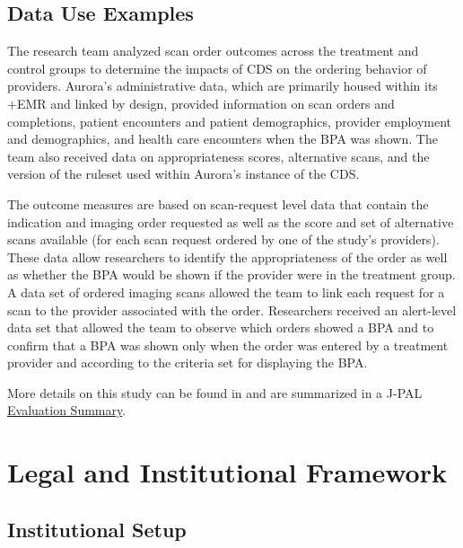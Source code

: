\documentclass[
]{book}
\begin{document}
\hypertarget{data-use-examples-4}{%
\subsection{Data Use Examples}\label{data-use-examples-4}}

The research team analyzed scan order outcomes across the treatment and control groups to determine the impacts of CDS on the ordering behavior of providers. Aurora's administrative data, which are primarily housed within its +EMR\textbar{} and linked by design, provided information on scan orders and completions, patient encounters and patient demographics, provider employment and demographics, and health care encounters when the BPA was shown. The team also received data on appropriateness scores, alternative scans, and the version of the ruleset used within Aurora's instance of the CDS.

The outcome measures are based on scan-request level data that contain the indication and imaging order requested as well as the score and set of alternative scans available (for each scan request ordered by one of the study's providers). These data allow researchers to identify the appropriateness of the order as well as whether the BPA would be shown if the provider were in the treatment group. A data set of ordered imaging scans allowed the team to link each request for a scan to the provider associated with the order. Researchers received an alert-level data set that allowed the team to observe which orders showed a BPA and to confirm that a BPA was shown only when the order was entered by a treatment provider and according to the criteria set for displaying the BPA.

More details on this study can be found in \citep{doyle2019} and are summarized in a J-PAL \href{https://www.povertyactionlab.org/evaluation/clinical-decision-support-radiology-imaging-united-states}{Evaluation Summary}.

\hypertarget{legal-and-institutional-framework-4}{%
\section{Legal and Institutional Framework}\label{legal-and-institutional-framework-4}}

\hypertarget{institutional-setup-4}{%
\subsection{Institutional Setup}\label{institutional-setup-4}}
\end{document}
